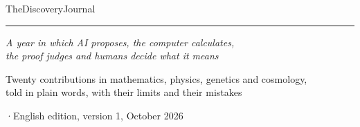 \thispagestyle{empty}
\vspace*{2.2cm}
{\sffamily\bfseries\footnotesize\color{okbleu}}\par
\vspace{1.4cm}
{\fontsize{34}{38}\selectfont The\hspace{0.3em}Discovery\hspace{0.3em}Journal\par}
\vspace{0.6cm}
{\color{okorange}\rule{3.2cm}{1.6pt}}\par
\vspace{0.5cm}
{\large\itshape A year in which AI proposes, the computer calculates,\\ the proof judges and humans decide what it
means\par}
\vspace{1.4cm}
{\normalsize Twenty contributions in mathematics, physics, genetics and cosmology,\\
told in plain words, with their limits and their mistakes\par}
\vspace*{\fill}
{\sffamily\footnotesize\color{encre!80}\quad·\quad\lfstyle English edition, version 1,
October 2026\par}
\clearpage

